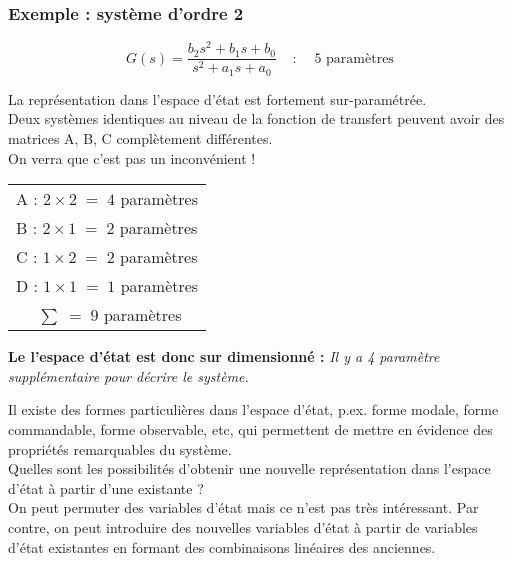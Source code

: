 \documentclass[document.tex]{subfiles}
\begin{document}
\subsubsection{Exemple : système d'ordre 2}

\begin{equation}
G(s) = \frac{b_2s^2+b_1s+b_0}{s^2+a_1s+a_0}\;\;\;\; : \;\;\;\; 5 \text{ paramètres} 
\end{equation}

La représentation dans l'espace d'état est fortement sur-paramétrée.\\

Deux systèmes identiques au niveau de la fonction de transfert peuvent avoir des matrices A, B, C complètement différentes.\\

On verra que c'est pas un inconvénient !\\

\begin{center}
\begin{tabular}{l}
A : $2 \times 2\;=\;4$ paramètres\\
B : $2 \times 1\;=\;2$ paramètres\\
C : $1 \times 2\;=\;2$ paramètres\\
D : $1 \times 1\;=\;1$ paramètres\\\hline
$ \;\;\;\;\;\sum\;=\;9$ paramètres
\end{tabular}
\end{center}
\begin{flushleft}
\textbf{\large Le l'espace d'état est donc sur dimensionné :} 
\textit{Il y a 4 paramètre supplémentaire pour décrire le système.}
\end{flushleft}

Il existe des formes particulières dans l'espace d'état, p.ex. forme modale, forme commandable, forme observable, etc, qui permettent de mettre en évidence des propriétés remarquables du système.\\

Quelles sont les possibilités d'obtenir une nouvelle représentation dans l'espace d'état à partir d'une existante ?\\

On peut permuter des variables d'état mais ce n'est pas très intéressant. Par contre, on peut introduire des nouvelles variables d'état à partir de variables d'état
existantes en formant des combinaisons linéaires des anciennes.\\
\end{document}
